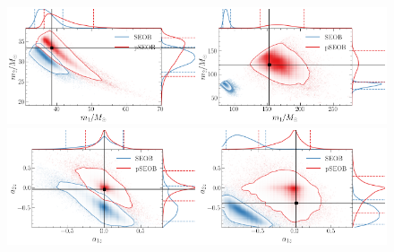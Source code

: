 \documentclass[twocolumn,prd,aps,superscriptaddress,preprintnumbers,tightenlines,showpacs,nofootinbib,eqsecnum,amsfonts,amsmath]{revtex4-1}
\begin{document}

\begin{figure}%
	\includegraphics[width=0.5\textwidth]{figures/GW150914_simulated_signal_0p5_gr_ngr_m1m2.png}\includegraphics[width=0.5\textwidth]{figures/GW190521_simulated_signal_0p5_gr_ngr_m1m2.png}
	\includegraphics[width=0.5\textwidth]{figures/GW150914_simulated_signal_0p5_gr_ngr_a1za2z.png}\includegraphics[width=0.5\textwidth]{figures/GW190521_simulated_signal_0p5_gr_ngr_a1za2z.png}	

\end{figure}
\end{document}
